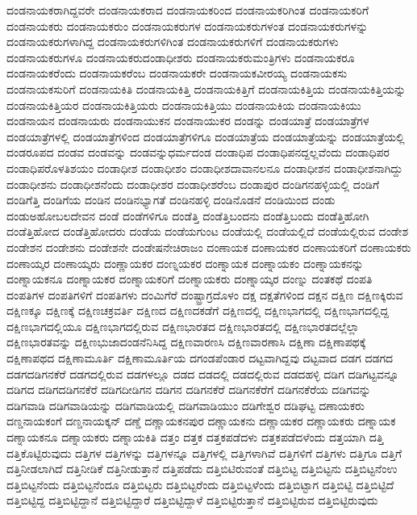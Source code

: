 {ದಂಡನಾಯಕರಾಗಿದ್ದವರೇ
ದಂಡನಾಯಕರಾದ
ದಂಡನಾಯಕರಿಂದ
ದಂಡನಾಯಕರಿಗಿಂತ
ದಂಡನಾಯಕರಿಗೆ
ದಂಡನಾಯಕರು
ದಂಡನಾಯಕರುಂ
ದಂಡನಾಯಕರುಗಳ
ದಂಡನಾಯಕರುಗಳಂತ
ದಂಡನಾಯಕರುಗಳನ್ನು
ದಂಡನಾಯಕರುಗಳಾಗಿದ್ದ
ದಂಡನಾಯಕರುಗಳಿಗಿಂತ
ದಂಡನಾಯಕರುಗಳಿಗೆ
ದಂಡನಾಯಕರುಗಳು
ದಂಡನಾಯಕರುಗಳೂ
ದಂಡನಾಯಕರುದಂಡಾಧೀಶರು
ದಂಡನಾಯಕರುಮಂತ್ರಿಗಳು
ದಂಡನಾಯಕರೂ
ದಂಡನಾಯಕರೆಂದು
ದಂಡನಾಯಕರೆಂಬ
ದಂಡನಾಯಕರೇ
ದಂಡನಾಯಕವೀರಯ್ಯ
ದಂಡನಾಯಕಸು
ದಂಡನಾಯಕಸುರಿಗೆ
ದಂಡನಾಯಕಿತಿ
ದಂಡನಾಯಕಿತ್ತಿ
ದಂಡನಾಯಕಿತ್ತಿಗೆ
ದಂಡನಾಯಕಿತ್ತಿಯ
ದಂಡನಾಯಕಿತ್ತಿಯನ್ನು
ದಂಡನಾಯಕಿತ್ತಿಯರ
ದಂಡನಾಯಕಿತ್ತಿಯರು
ದಂಡನಾಯಕಿತ್ತಿಯು
ದಂಡನಾಯಕಿಯ
ದಂಡನಾಯಕಿಯು
ದಂಡನಾಯನ
ದಂಡನಾಯರು
ದಂಡನಾಯುಕನ
ದಂಡನಾಯುಕರ
ದಂಡನ್ನು
ದಂಡಯಾತ್ರೆ
ದಂಡಯಾತ್ರೆಗಳ
ದಂಡಯಾತ್ರೆಗಳಲ್ಲಿ
ದಂಡಯಾತ್ರೆಗಳಿಂದ
ದಂಡಯಾತ್ರೆಗಳಿಗೂ
ದಂಡಯಾತ್ರೆಯ
ದಂಡಯಾತ್ರೆಯನ್ನು
ದಂಡಯಾತ್ರೆಯಲ್ಲಿ
ದಂಡರೂಪದ
ದಂಡವ
ದಂಡವನ್ನು
ದಂಡವನ್ನುಧರ್ಮದಂಡ
ದಂಡಾಧಿಪ
ದಂಡಾಧಿಪನದ್ದಲ್ಲವೆಂದು
ದಂಡಾಧಿಪರ
ದಂಡಾಧಿಪರೊಳತಿಶಯಂ
ದಂಡಾಧೀಶ
ದಂಡಾಧೀಶಂ
ದಂಡಾಧೀಶದಾವಾನಲನೂ
ದಂಡಾಧೀಶನ
ದಂಡಾಧೀಶನಾಗಿದ್ದು
ದಂಡಾಧೀಶನು
ದಂಡಾಧೀಶನೆಂದು
ದಂಡಾಧೀಶರ
ದಂಡಾಧೀಶರೆಂಬ
ದಂಡಾಪುರ
ದಂಡಿಗನಹಳ್ಳಿಯಲ್ಲಿ
ದಂಡಿಗೆ
ದಂಡಿಗೆತ್ತಿ
ದಂಡಿಗೆಯ
ದಂಡಿನ
ದಂಡಿನಭ್ಯಾಗತೆ
ದಂಡಿನಹಳ್ಳಿ
ದಂಡಿನೊಡನೆ
ದಂಡಿಯಿಂದ
ದಂಡು
ದಂಡುಅಹೋಬಲದೇವನ
ದಂಡೆ
ದಂಡೆಗಳಿಗೂ
ದಂಡೆತ್ತಿ
ದಂಡೆತ್ತಿಬಂದನು
ದಂಡೆತ್ತಿಬಂದು
ದಂಡೆತ್ತಿಹೋಗಿ
ದಂಡೆತ್ತಿಹೋದ
ದಂಡೆತ್ತಿಹೋದರು
ದಂಡೆಯ
ದಂಡೆಯಗುಂಟ
ದಂಡೆಯಲ್ಲಿ
ದಂಡೆಯಲ್ಲಿದೆ
ದಂಡೆಯಲ್ಲಿರುವ
ದಂಡೇಶ
ದಂಡೇಶನ
ದಂಡೇಶನು
ದಂಡೇಶನೇ
ದಂಡೇಷನೇಚಿರಾಜಂ
ದಂಣಾಯಕ
ದಂಣಾಯಕರ
ದಂಣಾಯಕರಿಗೆ
ದಂಣಾಯಕರು
ದಂಣಾಯ್ಕರ
ದಂಣಾಯ್ಕರು
ದಂಣ್ಣಾಯಕರ
ದಂಣ್ನಯಕರ
ದಂಣ್ನಾಯಕ
ದಂಣ್ನಾಯಕಂ
ದಂಣ್ನಾಯಕನನ್ನು
ದಂಣ್ನಾಯಕನೂ
ದಂಣ್ನಾಯಕರ
ದಂಣ್ನಾಯಕರಿಗೆ
ದಂಣ್ನಾಯಕರು
ದಂಣ್ನಾಯ್ಕರ
ದಂಣ್ನು
ದಂತಕಥೆ
ದಂಪತಿ
ದಂಪತಿಗಳ
ದಂಪತಿಗಳಿಗೆ
ದಂಪತಿಗಳು
ದಂಮಿಗೆರೆ
ದಂಷ್ಟ್ರಾಗ್ರದೊಳಂ
ದಕ್ಷ
ದಕ್ಷತೆಗಳಿಂದ
ದಕ್ಷನ
ದಕ್ಷಿಣ
ದಕ್ಷಿಣಕ್ಕಿರುವ
ದಕ್ಷಿಣಕ್ಕೂ
ದಕ್ಷಿಣಕ್ಕೆ
ದಕ್ಷಿಣಚಕ್ರವರ್ತಿ
ದಕ್ಷಿಣದ
ದಕ್ಷಿಣದಕಡೆಗೆ
ದಕ್ಷಿಣದಲ್ಲಿ
ದಕ್ಷಿಣಭಾಗದಲ್ಲಿ
ದಕ್ಷಿಣಭಾಗದಲ್ಲಿದ್ದ
ದಕ್ಷಿಣಭಾಗದಲ್ಲಿಯೂ
ದಕ್ಷಿಣಭಾಗದಲ್ಲಿರುವ
ದಕ್ಷಿಣಭಾರತದ
ದಕ್ಷಿಣಭಾರತದಲ್ಲಿ
ದಕ್ಷಿಣಭಾರತದಲ್ಲೆಲ್ಲಾ
ದಕ್ಷಿಣಭಾರತವನ್ನು
ದಕ್ಷಿಣಭುಜಾದಂಡನೆನಿಸಿದ್ದ
ದಕ್ಷಿಣವಾರಣಸಿ
ದಕ್ಷಿಣವಾರಣಾಸಿ
ದಕ್ಷಿಣಾ
ದಕ್ಷಿಣಾಪಥಕ್ಕೆ
ದಕ್ಷಿಣಾಪಥದ
ದಕ್ಷಿಣಾಮೂರ್ತಿ
ದಕ್ಷಿಣಾಮೂರ್ತಿಯ
ದಗಂಡಪೆಂಡಾರ
ದಟ್ಟವಾಗಿದ್ದವು
ದಟ್ಟವಾದ
ದಡಗ
ದಡಗದ
ದಡಗದಡಿಗನಕೆರೆ
ದಡಗದಲ್ಲಿರುವ
ದಡಗಳಲ್ಲೂ
ದಡದ
ದಡದಲ್ಲಿ
ದಡದಲ್ಲಿರುವ
ದಡದಹಳ್ಳಿ
ದಡಿಗ
ದಡಿಗಟ್ಟವನ್ನೂ
ದಡಿಗದ
ದಡಿಗದಡಿಗನಕೆರೆ
ದಡಿಗದೀಡಿಗನ
ದಡಿಗನ
ದಡಿಗನಕೆರೆ
ದಡಿಗನಕೆರೆಗೆ
ದಡಿಗನಕೆರೆಯ
ದಡಿಗವನ್ನು
ದಡಿಗವಾಡಿ
ದಡಿಗವಾಡಿಯನ್ನು
ದಡಿಗವಾಡಿಯಲ್ಲಿ
ದಡಿಗವಾಡಿಯುಂ
ದಡಿಗೇಶ್ವರ
ದಡಿಘಟ್ಟ
ದಣಾಯಕರು
ದಣ್ಡನಾಯಕಂಗೆ
ದಣ್ಡನಾಯಕ್ಕನ್
ದಣ್ಡೆ
ದಣ್ಣಾಯಕನಪುರ
ದಣ್ಣಾಯಕನು
ದಣ್ಣಾಯಕರ
ದಣ್ಣಾಯಕರು
ದಣ್ನಾಯಕ
ದಣ್ನಾಯಕನೂ
ದಣ್ನಾಯಕರು
ದಣ್ನಾಯಕಿತಿ
ದತ್ತಂ
ದತ್ತಕ
ದತ್ತಕಪಡೆದಳು
ದತ್ತಕಪಡೆದಳೆಂದು
ದತ್ತಯಾಗಿ
ದತ್ತಿ
ದತ್ತಿಕೊಟ್ಟಿರುವುದು
ದತ್ತಿಗಳ
ದತ್ತಿಗಳನ್ನು
ದತ್ತಿಗಳನ್ನೂ
ದತ್ತಿಗಳಲ್ಲಿ
ದತ್ತಿಗಳಾಗಿವೆ
ದತ್ತಿಗಳಿಗೆ
ದತ್ತಿಗಳು
ದತ್ತಿಗೂ
ದತ್ತಿಗೆ
ದತ್ತಿನೀಡಲಾಗಿದೆ
ದತ್ತಿನೀಡಿಕೆ
ದತ್ತಿನೀಡುತ್ತಾನೆ
ದತ್ತಿಪಡೆದು
ದತ್ತಿಬಿಟಿರುವಂತೆ
ದತ್ತಿಬಿಟ್ಟ
ದತ್ತಿಬಿಟ್ಟನು
ದತ್ತಿಬಿಟ್ಟನೆಂಉ
ದತ್ತಿಬಿಟ್ಟನೆಂದು
ದತ್ತಿಬಿಟ್ಟನೆಂದೂ
ದತ್ತಿಬಿಟ್ಟರು
ದತ್ತಿಬಿಟ್ಟರೆಂದು
ದತ್ತಿಬಿಟ್ಟಳೆಂದು
ದತ್ತಿಬಿಟ್ಟಾಗ
ದತ್ತಿಬಿಟ್ಟಿ
ದತ್ತಿಬಿಟ್ಟಿದೆ
ದತ್ತಿಬಿಟ್ಟಿದ್ದ
ದತ್ತಿಬಿಟ್ಟಿದ್ದಾನೆ
ದತ್ತಿಬಿಟ್ಟಿದ್ದಾರೆ
ದತ್ತಿಬಿಟ್ಟಿದ್ದಾಳೆ
ದತ್ತಿಬಿಟ್ಟಿರುತ್ತಾನೆ
ದತ್ತಿಬಿಟ್ಟಿರುವ
ದತ್ತಿಬಿಟ್ಟಿರುವುದು
}
